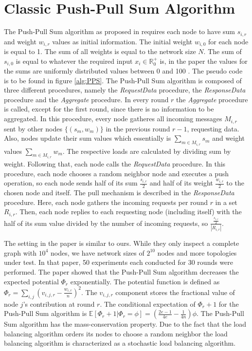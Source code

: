 \section{Classic Push-Pull Sum Algorithm}\label{sec:classicPPS}
The Push-Pull Sum algorithm as proposed in \cite{nugroho2023PushPullSumDataAg} requires each node to have sum $s_{i,r}$ and weight $w_{i,r}$ values as initial information. The initial weight $w_{i,0}$ for each node is equal to 1. The sum of all weights is equal to the network size $N$. The sum of $s_{i,0}$ is equal to whatever the required input $x_i \in \mathbb{R}^{+}_{0}$ is, in the paper the values for the sums are uniformly distributed values between 0 and 100 \cite{nugroho2023PushPullSumDataAg}. The pseudo code is to be found in figure \ref{alg:PPS}. The Push-Pull Sum algorithm is composed of three different procedures, namely the \textit{RequestData} procedure, the \textit{ResponseData} procedure and the \textit{Aggregate} procedure. In every round $r$ the \textit{Aggregate} procedure is called, except for the first round, since there is no information to be aggregated. In this procedure, every node gatheres all incoming messages $M_{i,r}$ sent by other nodes $\{(s_m, w_m)\}$ in the previous round $r-1$, requesting data. Also, nodes update their sum values which essentially is $\sum_{m \in M_{i,r}}{s_m}$ and weight values $\sum_{m \in M_{i,r}}{w_m}$. The respective loads are calculated by dividing sum by weight. Following that, each node calls the \textit{RequestData} procedure. In this procedure, each node chooses a random neighbor node and executes a push operation, so each node sends half of its sum $\frac{s_{i,r}}{2}$ and half of its weight $\frac{w_{i,r}}{2}$ to the chosen node and itself. The pull mechanism is described in the \textit{ResponseData} procedure. Here, each node gathers the incoming requests per round $r$ in a set $R_{i, r}$. Then, each node replies to each requesting node (including itself) with the half of its sum value divided by the number of incoming requests, so $\frac{\frac{s_{i,r}}{2}}{|R_{i, r}|}$.



The setting in the paper \cite{nugroho2023PushPullSumDataAg} is similar to ours. While they only inspect a complete graph with $10^{4}$ nodes, we have network sizes of $2^{10}$ nodes and more topologies under test. In that paper, 50 experiments each conducted for 30 rounds were performed. The paper showed that the Push-Pull Sum algorithm decreases the expected potential $\Phi_r$ exponentially. The potential function is defined as $\Phi_r=\sum_{i,j}\left(v_{i,j,r}-\frac{w_{i,r}}{n}\right)^{2}$. The $v_{i,j,r}$ component stores the fractional value of node $j$'s contribution at round $r$. The conditional expectation of $\Phi_r+1$ for the Push-Pull Sum algorithm is $\mathbb{E}[\Phi_r+1|\Phi_r=\phi]=(\frac{2e-1}{4e}-\frac{1}{4n})\phi$. The Push-Pull Sum algorithm has the mass-conservation property. Due to the fact that the load balancing algorithm orders its nodes to choose a random neighbor the load balancing algorithm is characterized as a stochastic load balancing algorithm. \cite{nugroho2023PushPullSumDataAg}

